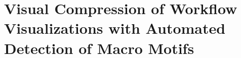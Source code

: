 






\chapter{Visual Compression of Workflow Visualizations with Automated Detection of Macro Motifs}






 
